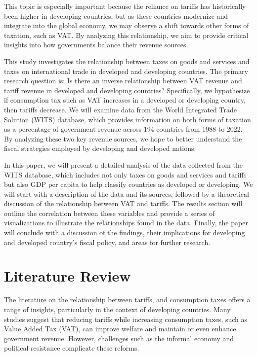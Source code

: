 \documentclass[12pt]{article}
\begin{document}
This topic is especially important because the reliance on tariffs has historically been higher in developing countries, but as these countries modernize and integrate into the global economy, we may observe a shift towards other forms of taxation, such as VAT. By analyzing this relationship, we aim to provide critical insights into how governments balance their revenue sources.

This study investigates the relationship between taxes on goods and services and taxes on international trade in developed and developing countries. The primary research question is: Is there an inverse relationship between VAT revenue and tariff revenue in developed and developing countries? Specifically, we hypothesize  if consumption tax such as VAT increases in a developed or developing country, then tariffs decrease. We will examine data from the World Integrated Trade Solution (WITS) database, which provides information on both forms of taxation as a percentage of government revenue across 194 countries from 1988 to 2022. By analyzing these two key revenue sources, we hope to better understand the fiscal strategies employed by developing and developed nations.

In this paper, we will present a detailed analysis of the data collected from the WITS database, which includes not only taxes on goods and services and tariffs but also GDP per capita to help classify countries as developed or developing. We will start with a description of the data and its sources, followed by a theoretical discussion of the relationship between VAT and tariffs. The results section will outline the correlation between these variables and provide a series of visualizations to illustrate the relationships found in the data. Finally, the paper will conclude with a discussion of the findings, their implications for developing and developed country's fiscal policy, and areas for further research.

\section{Literature Review} \label{sec:literature}

The literature on the relationship between tariffs, and consumption taxes offers a range of insights, particularly in the context of developing countries. Many studies suggest that reducing tariffs while increasing consumption taxes, such as Value Added Tax (VAT), can improve welfare and maintain or even enhance government revenue. However, challenges such as the informal economy and political resistance complicate these reforms.
\end{document}
